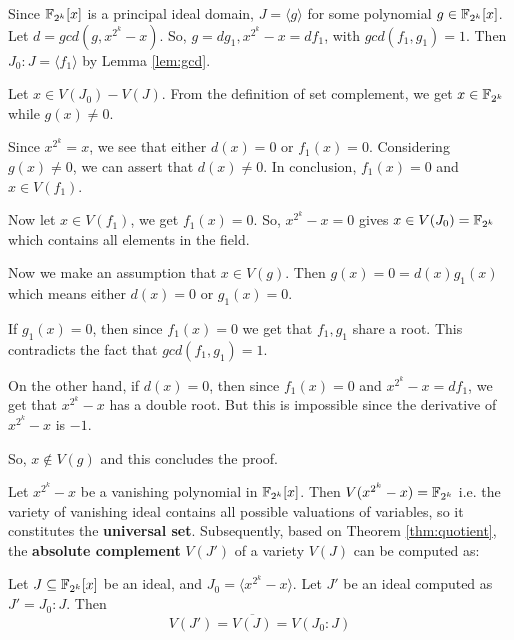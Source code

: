 \begin{Proof}
Since ${\mathbb{F}}_{2^k}[x]$ is a principal ideal domain, $ J = \langle g\rangle$
for some polynomial $ g \in {\mathbb{F}}_{2^k}[x]$. Let $d = gcd(g, x^{2^k} -
x)$. So, $g = dg_1 , x^{2^k} - x = df_1$, with $gcd(f_1 , g_1 ) =
1$. Then $J_0 : J = \langle f_1 \rangle$ by Lemma \ref{lem:gcd}. 

Let $x \in V(J_0 ) - V(J)$. From the definition of set
complement, we get $x \in {\mathbb{F}}_{2^k}$ while $g(x) \neq 0$.  

Since $x^{2^k} = x$, we see that either $d(x) = 0$ or $f_1 (x) =
0$. Considering $g(x) \neq 0$, we can assert that $d(x) \neq 0$. In
conclusion, $f_1 (x) = 0$ and $x \in V(f_1 )$. 

Now let $x \in V(f_1 )$, we get $f_1 (x) = 0$. So, $x^{2^k} - x = 0$
gives $x \in V(J_0) = {\mathbb{F}}_{2^k}$ which  contains all elements in the
field. 

Now we make an assumption that $x \in V(g)$. Then $g(x) = 0 =
d(x)g_1(x)$ which means either $d(x) = 0$ or $g_1 (x) = 0$. 

If $g_1 (x) = 0$, then since $f_1 (x) = 0$ we get that $f_1 , g_1$
share a root. This contradicts the fact that $gcd(f_1 , g_1 ) = 1$.

On the other hand, if $d(x) = 0$, then since $f_1 (x) = 0$ and
$x^{2^k} - x = df_1$, we get that $x^{2^k} - x$ has a double root. 
But this is impossible since the derivative of $x^{2^k} - x$ is $-1$.

So, $x \notin V(g)$ and this concludes the proof.
\end{Proof}


Let $x^{2^k}-x$ be a vanishing polynomial in ${\mathbb{F}}_{2^k}[x]$. Then $V(x^{2^k}-x)={\mathbb{F}}_{2^k}$
i.e. the variety of vanishing ideal contains
 all possible valuations of variables, so it constitutes the {\bf
   universal set}. Subsequently, based on Theorem \ref{thm:quotient},
 the {\bf absolute complement} $V(J')$ of a variety $V(J)$ can be
 computed as: 

\begin{Corollary} \label{cor:complement}
Let $J\subseteq {\mathbb{F}}_{2^k}[x]$ be an ideal, and $J_0=\langle x^{2^k}-x\rangle$. Let $J'$ be an ideal 
computed as $J' = J_0:J$. Then $$V(J') = \overline{V(J)} = {V}(J_0:J)$$
\end{Corollary}

